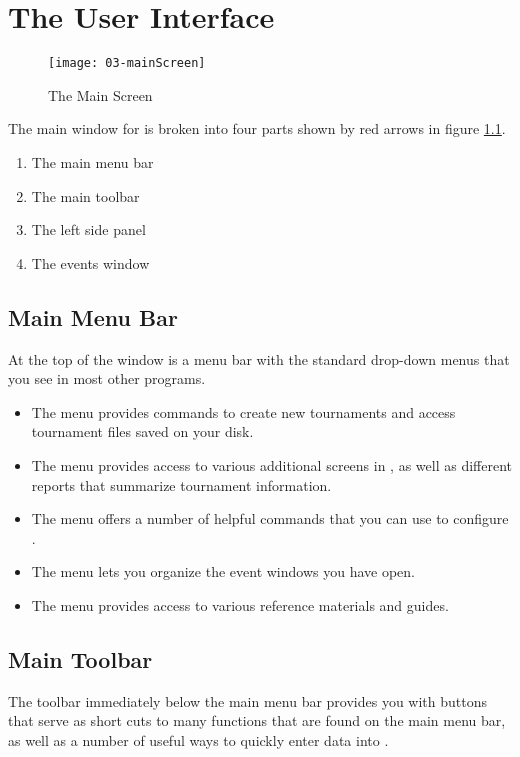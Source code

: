 \documentclass[a4paper,11pt]{memoir}
\begin{document}
\chapter{The User Interface}

\begin{figure}[!ht]
 \centering
 \texttt{[image: 03-mainScreen]}
 \caption{The Main Screen} \label{fig:03-mainScreen}
\end{figure}

The main window for \fencingtime{} is broken into four parts shown by red arrows in figure \ref{fig:03-mainScreen}.

\begin{enumerate}
 \item The main menu bar
 \item The main toolbar
 \item The left side panel
 \item The events window
\end{enumerate}

\section{Main Menu Bar}
At the top of the window is a menu bar with the standard drop-down menus that you see in most other programs. 

\begin{itemize}
 \item The  menu provides commands to create new tournaments and access \gls{tournament} files saved on your disk. 
 \item The  menu provides access to various additional screens in \fencingtime{}, as well as different reports that summarize tournament information. 
 \item The  menu offers a number of helpful commands that you can use to configure \fencingtime{}. 
 \item The  menu lets you organize the event windows you have open.
 \item The  menu provides access to various reference materials and guides.
\end{itemize}

\section{Main Toolbar}
The toolbar immediately below the main menu bar provides you with buttons that serve as short cuts to many functions that are found on the main menu bar, as well as a number of useful ways to quickly enter data into \fencingtime{}.
\end{document}

